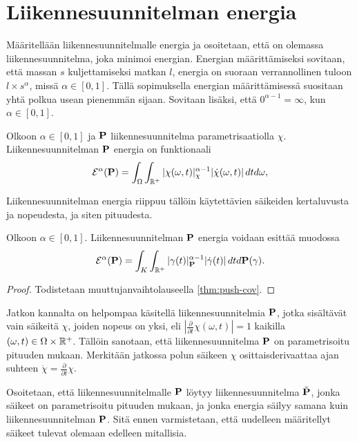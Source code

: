 \documentclass[12pt,oneside,a4paper]{amsbook} %
\begin{document}
\section{Liikennesuunnitelman energia}
Määritellään liikennesuunnitelmalle energia ja osoitetaan, että on olemassa liikennesuunnitelma, joka minimoi energian. Energian määrittämiseksi sovitaan, että massan $s$ kuljettamiseksi matkan $l$, energia on suoraan verrannollinen tuloon $l \times s^\alpha$, missä $\alpha \in [0, 1]$. Tällä sopimuksella energian määrittämisessä suositaan yhtä polkua usean pienemmän sijaan.  Sovitaan lisäksi, että $0^{\alpha - 1} = \infty$, kun $\alpha \in [0, 1]$. 

\begin{definition}\label{def:energyOfP}
    Olkoon $\alpha \in [0, 1]$ ja $\P$ liikennesuunnitelma parametrisaatiolla $\chi$. Liikennesuunnitelman $\P$ energia on funktionaali
        \begin{equation*}
            \E^\alpha(\P) = \int_\Omega \int_{\R^+} |\chi(\omega, t)|_\chi^{\alpha-1}|\dot \chi(\omega, t)|\, dtd\omega,
        \end{equation*}
\end{definition}

Liikennesuunnitelman energia riippuu tällöin käytettävien säikeiden kertaluvusta ja nopeudesta, ja siten pituudesta.

\begin{remark}\label{thm:energyOfPIndependent}
    Olkoon $\alpha \in [0, 1].$ Liikennesuunnitelman $\P$ energia voidaan esittää muodossa
    \begin{equation*}
        \E^\alpha(\P) = \int_K \int_{\R^+}|\gamma(t)|^{\alpha-1}_\P|\dot\gamma(t)| \, dtd\P(\gamma).
    \end{equation*}
\end{remark}
\begin{proof}
    Todistetaan muuttujanvaihtolauseella \ref{thm:push-cov}.
\end{proof}

Jatkon kannalta on helpompaa käsitellä liikennesuunnitelmia $\P$, jotka sisältävät vain säikeitä $\chi$, joiden nopeus on yksi, eli $|\frac{\partial}{\partial t}\chi(\omega, t)| = 1$ kaikilla $(\omega, t) \in \Omega \times \Rp$. Tällöin sanotaan, että liikennesuunnitelma $\P$ on parametrisoitu pituuden mukaan. Merkitään jatkossa polun säikeen $\chi$ osittaisderivaattaa ajan suhteen $\dot \chi = \frac{\partial}{\partial t}\chi$. 

Osoitetaan, että liikennesuunnitelmalle $\P$ löytyy liikennesuunnitelma $\tilde \P$, jonka säikeet on parametrisoitu pituuden mukaan, ja jonka energia säilyy samana kuin liikennesuunnitelman $\P$. Sitä ennen varmistetaan, että uudelleen määritellyt säikeet tulevat olemaan edelleen mitallisia.
\end{document}
